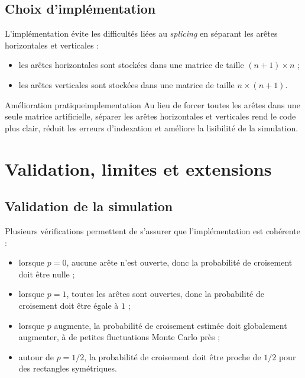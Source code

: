 \documentclass[11pt,a4paper]{report}
\begin{document}
\section{Choix d'implémentation}

L'implémentation évite les difficultés liées au \textit{splicing} en séparant les arêtes horizontales et verticales :
\begin{itemize}
    \item les arêtes horizontales sont stockées dans une matrice de taille $(n+1)\times n$ ;
    \item les arêtes verticales sont stockées dans une matrice de taille $n\times(n+1)$.
\end{itemize}

\begin{remarkbox}{Amélioration pratique}{implementation}
Au lieu de forcer toutes les arêtes dans une seule matrice artificielle, séparer les arêtes horizontales et verticales rend le code plus clair, réduit les erreurs d'indexation et améliore la lisibilité de la simulation.
\end{remarkbox}

\chapter{Validation, limites et extensions}

\section{Validation de la simulation}

Plusieurs vérifications permettent de s'assurer que l'implémentation est cohérente :
\begin{itemize}
    \item lorsque $p=0$, aucune arête n'est ouverte, donc la probabilité de croisement doit être nulle ;
    \item lorsque $p=1$, toutes les arêtes sont ouvertes, donc la probabilité de croisement doit être égale à $1$ ;
    \item lorsque $p$ augmente, la probabilité de croisement estimée doit globalement augmenter, à de petites fluctuations Monte Carlo près ;
    \item autour de $p=1/2$, la probabilité de croisement doit être proche de $1/2$ pour des rectangles symétriques.
\end{itemize}
\end{document}
